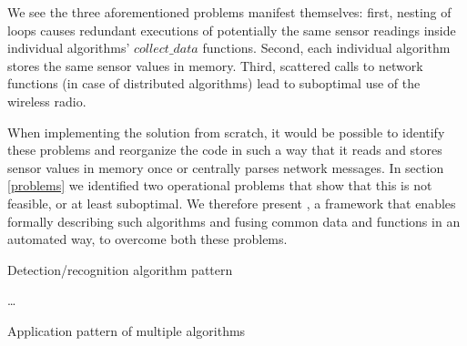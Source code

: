 \documentclass[3p,times,procedia]{elsarticle}
\begin{document}
We see the three aforementioned problems manifest themselves: first, nesting of
loops causes redundant executions of potentially the same sensor readings
inside individual algorithms' $collect\_data$ functions. Second, each
individual algorithm stores the same sensor values in memory. Third, scattered
calls to network functions (in case of distributed algorithms) lead to
suboptimal use of the wireless radio.

When implementing the solution from scratch, it would be possible to identify
these problems and reorganize the code in such a way that it reads and stores
sensor values in memory once or centrally parses network messages. In section
\ref{problems} we identified two operational problems that show that this is
not feasible, or at least suboptimal. We therefore present \FOO, a framework
that enables formally describing such algorithms and fusing common data and
functions in an automated way, to overcome both these problems.

\begin{algorithm}[t]
  \small
  \caption{Detection/recognition algorithm pattern}
  \label{alg:pattern}
  \begin{algorithmic}
     
           
          
      \EndFor
      \State {}  \label{alg:id-algo-pattern-send1}
    \EndFunction
       \label{alg:id-algo-pattern-loop2} \label{alg:id-algo-pattern-common-data}
         
          \State \dots {}
          \State {}  \label{alg:id-algo-pattern-send2}
        \EndIf
      \EndFor
    \EndFunction
  \end{algorithmic}
\end{algorithm}

\begin{algorithm}[t]
  \small
  \caption{Application pattern of multiple algorithms}
  \label{alg:application}
  \begin{algorithmic}
      \State {}
    \EndFor
            
      \State {}
    \EndFor
  \end{algorithmic}
\end{algorithm}
\end{document}
